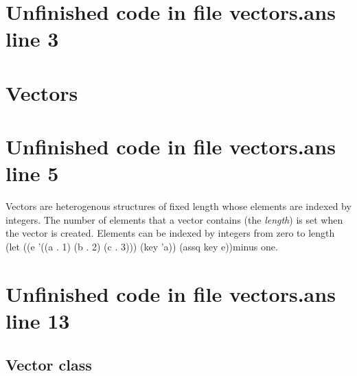 \documentclass[twoside,9pt]{report}
\begin{document}
\section{Unfinished code in file vectors.ans line 3}
\section{Vectors}
\label{vectors}
\section{Unfinished code in file vectors.ans line 5}


Vectors are heterogenous structures of fixed length whose elements are indexed by integers. The number of elements that a vector contains (the \emph{length}) is set when the vector is created. Elements can be indexed by integers from zero to length (let ((e '((a . 1) (b . 2) (c . 3))) (key 'a)) (assq key e))minus one.

\section{Unfinished code in file vectors.ans line 13}
\subsection{Vector class}
\label{vector-class}
\end{document}
